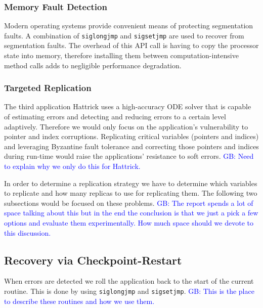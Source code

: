 \documentclass[prodmode,acmtecs]{acmsmall} %
\newcommand{\greg}[1]{%
  \textcolor{blue}{GB: #1}
}
\begin{document}
\subsubsection{Memory Fault Detection}
\label{sec:res_tech:err_det:mem}

Modern operating systems provide convenient means of protecting segmentation faults. A combination of \texttt{siglongjmp} and \texttt{sigsetjmp} are used to recover from segmentation faults. The overhead of this API call is having to copy the processor state into memory, therefore installing them between computation-intensive method calls adds to negligible performance degradation.

\subsubsection{Targeted Replication}
\label{sec:res_tech:err_det:repl}

The third application Hattrick uses a high-accuracy ODE solver that is capable of estimating errors and detecting and reducing errors to a certain level adaptively. Therefore we would only focus on the application's vulnerability to pointer and index corruptions. Replicating critical variables (pointers and indices) and leveraging Byzantine fault tolerance and correcting those pointers and indices during run-time would raise the applications' resistance to soft errors.
\greg{Need to explain why we only do this for Hattrick.}

In order to determine a replication strategy we have to determine which variables to replicate and how many replicas to use for replicating them. The following two subsections would be focused on these problems.
\greg{The report spends a lot of space talking about this but in the end the conclusion is that we just a pick a few options and evaluate them experimentally. How much space should we devote to this discussion.}

\subsection{Recovery via Checkpoint-Restart}
\label{sec:res_tech:cr}

When errors are detected we roll the application back to the start of the current routine.
This is done by using \texttt{siglongjmp} and \texttt{sigsetjmp}. \greg{This is the place to describe these routines and how we use them.}
\end{document}
